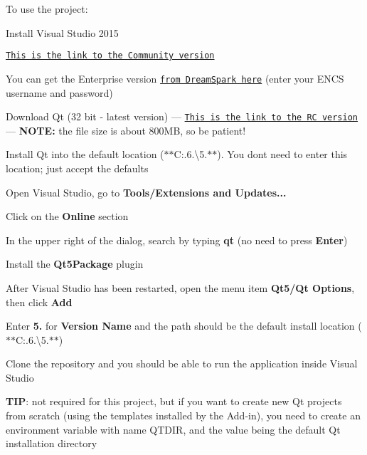 To use the project\+:


\begin{DoxyEnumerate}
\item Install Visual Studio 2015
\begin{DoxyEnumerate}
\item \href{https://go.microsoft.com/fwlink/?LinkId=691978&clcid=0x409}{\tt This is the link to the Community version}
\item You can get the Enterprise version \href{https://aits.encs.concordia.ca/aits/sec/msdnaa}{\tt from Dream\+Spark here} (enter your E\+N\+C\+S username and password)
\end{DoxyEnumerate}
\item Download Qt (32 bit -\/ latest version) --- \href{http://download.qt.io/development_releases/qt/5.6/5.6.0-rc/qt-opensource-windows-x86-msvc2015-5.6.0-rc.exe}{\tt This is the link to the R\+C version} --- {\bfseries N\+O\+T\+E\+:} the file size is about 800\+M\+B, so be patient!
\item Install Qt into the default location ($\ast$$\ast$\+C\+:.6.\textbackslash{}5.$\ast$$\ast$). You don\textquotesingle{}t need to enter this location; just accept the defaults
\item Open Visual Studio, go to {\bfseries Tools/\+Extensions and Updates...}
\item Click on the {\bfseries Online} section
\item In the upper right of the dialog, search by typing {\bfseries qt} (no need to press {\bfseries Enter})
\item Install the {\bfseries Qt5\+Package} plugin
\item After Visual Studio has been restarted, open the menu item {\bfseries Qt5/\+Qt Options}, then click {\bfseries Add}
\item Enter {\bfseries 5.} for {\bfseries Version Name} and the path should be the default install location ($\ast$$\ast$\+C\+:.6.\textbackslash{}5.$\ast$$\ast$)
\item Clone the repository and you should be able to run the application inside Visual Studio
\end{DoxyEnumerate}

{\bfseries T\+I\+P}\+: not required for this project, but if you want to create new Qt projects from scratch (using the templates installed by the Add-\/in), you need to create an environment variable with name {\ttfamily Q\+T\+D\+I\+R}, and the value being the default Qt installation directory 